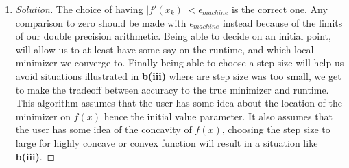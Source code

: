 \documentclass[12pt]{article}
\makeatletter
\theoremstyle{homework}
\newenvironment{exercise}[1]
{\def\@currentlabel{#1}\exercisecore}
{\endexercisecore}
\makeatother
\begin{document}
\begin{exercise}{\textbf{P8}}
\begin{enumerate}
    \item[\textbf{(d)}] 
    \begin{proof}[Solution] The choice of having $|f'(x_k)| < \epsilon_{machine}$ is the correct one. Any comparison to zero should be made with $\epsilon_{machine}$ instead because of the limits of our double precision arithmetic. Being able to decide on an initial point, will allow us to at least have some say on the runtime, and which local minimizer we converge to. Finally being able to choose a step size will help us avoid situations illustrated in \textbf{b(iii)} where are step size was too small, we get to make the tradeoff between accuracy to the true minimizer and runtime.\\
      This algorithm assumes that the user has some idea about the location of the minimizer on $f(x)$ hence the initial value parameter. It also assumes that the user has some idea of the concavity of $f(x)$, choosing the step size to large for highly concave or convex function will result in a situation like \textbf{b(iii)}. 

    \end{proof}
    \vspace{.15in}
  \end{enumerate}


\end{exercise}
\vspace{.5in}
\end{document}
